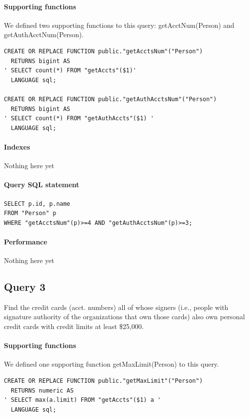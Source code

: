 \documentclass[11pt]{article}
\begin{document}
\paragraph{Supporting functions} We defined two supporting functions to this query: getAcctNum(Person) and getAuthAcctNum(Person).
\begin{verbatim}
CREATE OR REPLACE FUNCTION public."getAcctsNum"("Person")
  RETURNS bigint AS
' SELECT count(*) FROM "getAccts"($1)'
  LANGUAGE sql;

CREATE OR REPLACE FUNCTION public."getAuthAcctsNum"("Person")
  RETURNS bigint AS
' SELECT count(*) FROM "getAuthAccts"($1) '
  LANGUAGE sql;
\end{verbatim}

\paragraph{Indexes} Nothing here yet

\paragraph{Query SQL statement}
\begin{verbatim}
SELECT p.id, p.name
FROM "Person" p
WHERE "getAcctsNum"(p)>=4 AND "getAuthAcctsNum"(p)>=3;
\end{verbatim}

\paragraph{Performance} Nothing here yet

\subsection{Query 3}
Find the credit cards (acct. numbers) all of whose signers (i.e., people with signature authority of the organizations that own those cards) also own personal credit cards with credit limits at least \$25,000.

\paragraph{Supporting functions} We defined one supporting function getMaxLimit(Person) to this query.
\begin{verbatim}
CREATE OR REPLACE FUNCTION public."getMaxLimit"("Person")
  RETURNS numeric AS
' SELECT max(a.limit) FROM "getAccts"($1) a '
  LANGUAGE sql;
\end{verbatim}
\end{document}
